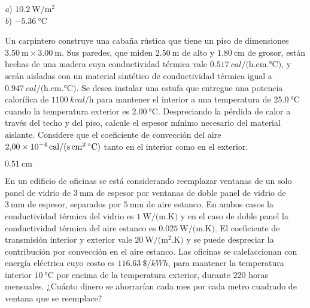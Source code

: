 \begin{Answer}
	\begin{minipage}[t]{.4\textwidth}
    \textit{a}) $\SI{10.2}{\watt/\square\metre}$\\ \textit{b}) $\SI{-5.36}{\celsius}$
  \end{minipage}
\end{Answer}
%
\begin{Exercise}
  Un carpintero construye una cabaña rústica que tiene un piso de dimensiones $\SI{3.50}{\metre} \times \SI{3.00}{\metre}$. Sus paredes, que miden $\SI{2.50}{\metre}$ de alto y $\SI{1.80}{\centi\metre}$ de grosor, están hechas de una madera cuya conductividad térmica vale $\SI{0.517}{cal/(\hour.\centi\metre.\celsius)}$, y serán aisladas con un material sintético de conductividad térmica igual a $\SI{0.947}{cal/(\hour.\centi\metre.\celsius)}$. Se desea instalar una estufa que entregue una potencia calorífica de $\SI{1100}{kcal/\hour}$ para mantener el interior a una temperatura de $\SI{25.0}{\celsius}$ cuando la temperatura exterior es $\SI{2.00}{\celsius}$. Despreciando la pérdida de calor a través del techo y del piso, calcule el espesor mínimo necesario del material aislante. Considere que el  coeficiente de convección del aire $\SI{2.00E-4}{cal/(\second.\centi\square\metre.\celsius)}$ tanto en el interior como en el exterior.
\end{Exercise}
\begin{Answer}
  $\SI{0.51}{\centi\metre}$
\end{Answer}
%
\begin{Exercise}
  En un edificio de oficinas se está considerando reemplazar ventanas de un solo panel de vidrio de $\SI{3}{\milli\metre}$ de espesor por ventanas de doble panel de vidrio de $\SI{3}{\milli\metre}$ de espesor, separados por $\SI{5}{\milli\metre}$ de aire estanco. En ambos casos la conductividad térmica del vidrio es $\SI{1}{\watt/(\metre.\kelvin)}$ y en el caso de doble panel la conductividad térmica del aire estanco es $\SI{0.025}{\watt/(\metre.\kelvin)}$. El coeficiente de transmisión interior y exterior vale $\SI{20}{\watt/(\metre\squared.\kelvin)}$ y se puede despreciar la contribución por convección en el aire estanco. Las oficinas se calefaccionan con energía eléctrica cuyo costo es $\SI{116.63}{\$/kWh}$, para mantener la temperatura interior $\SI{10}{\celsius}$ por encima de la temperatura exterior, durante 220 horas mensuales. ¿Cuánto dinero se ahorrarían cada mes por cada metro cuadrado de ventana que se reemplace?
\end{Exercise}
